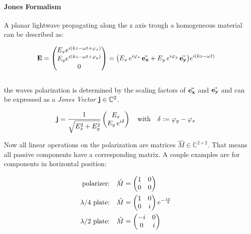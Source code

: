 \paragraph{Jones Formalism}
 A planar lightwave propagating along the z axis trough a homogeneous material can be described as:

\begin{equation}
    \vb E =
    \begin{pmatrix}
        E_x e^{i(kz - \omega t + \varphi_x)}\\
        E_y e^{i(kz - \omega t + \varphi_y)}\\
        0\\
    \end{pmatrix}
    =
    \qty(E_x \, e^{i \varphi_x} \, \va{e_x} +
         E_y \, e^{i \varphi_y} \, \va{e_y})
        e^{i(kz - \omega t)}
\end{equation}
\\

\noindent
the waves polarization is determined by the scaling factors of $\va{e_x}$ and $\va{e_y}$ and can be expressed as a \textit{Jones Vector} $\vb j \in \mathbb{C}^2$.

\begin{equation}
    \vb j = \frac{1}{\sqrt{E_x^2 + E_y^2}}
    \begin{pmatrix}
        E_x\\
        E_y \, e^{i \delta}
    \end{pmatrix}
    \qq{with}
    \delta := \varphi_y - \varphi_x
\end{equation}

\noindent
Now all linear operations on the polarization are matrices $\hat{M} \in \mathbb{C}^{2 \times 2}$. That means all passive components have a corresponding matrix. A couple examples are for components in horizontal position:


\begin{equation}
\begin{split}
    \qq*{polarizer:} \hat{M} &=
    \begin{pmatrix}
        1 & 0\\
        0 & 0
    \end{pmatrix}\\
    \qq*{$\lambda / 4$ plate:} \hat{M} &=
    \begin{pmatrix}
        1 & 0\\
        0 & i
    \end{pmatrix}
    e^{-\frac{i \pi}{4}}\\
    \qq*{$\lambda / 2$ plate:} \hat{M} &=
    \begin{pmatrix}
        -i & 0\\
        0 & i
    \end{pmatrix}\\
\end{split}
\end{equation}

